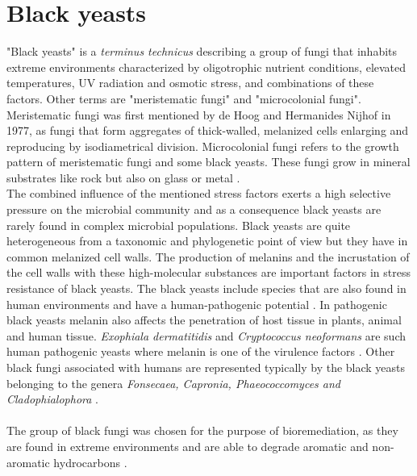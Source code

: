 \documentclass[12pt, a4paper]{report}
\begin{document}
\section{Black yeasts} 
"Black yeasts" is a \textit{terminus technicus} describing a group of fungi that inhabits extreme environments characterized by oligotrophic nutrient conditions, elevated temperatures, UV radiation and osmotic stress, and combinations of these factors. Other terms are "meristematic fungi" and "microcolonial fungi".
Meristematic fungi was first mentioned by de Hoog and Hermanides Nijhof in 1977, as fungi that form aggregates of thick-walled, melanized cells enlarging and reproducing by isodiametrical division. Microcolonial fungi refers to the growth pattern of meristematic fungi and some black yeasts. These fungi grow in mineral substrates like rock but also on glass or metal \cite{Sterflinger2006}. \\
The combined influence of the mentioned stress factors exerts a high selective pressure on the microbial community and as a consequence black yeasts are rarely found in complex microbial populations. Black yeasts are quite heterogeneous from a taxonomic and phylogenetic point of view but they have in common melanized cell walls. The production of melanins and the incrustation of the cell walls with these high-molecular substances are important factors in stress resistance of black yeasts. The black yeasts include species that are also found in human environments and have a human-pathogenic potential \cite{Sterflinger2006}. In pathogenic black yeasts melanin also affects the penetration of host tissue in plants, animal and human tissue. \textit{Exophiala dermatitidis} and \textit{Cryptococcus neoformans} are such human pathogenic yeasts where melanin is one of the virulence factors \cite{Hoog2003, Sterflinger2006}. Other black fungi associated with humans are represented typically by the black yeasts belonging to the genera \textit{Fonsecaea, Capronia, Phaeococcomyces and Cladophialophora} \cite{Blasi2015}. \\
\ \\
The group of black fungi was chosen for the purpose of bioremediation, as they are found in extreme environments and  are able to degrade aromatic and non-aromatic hydrocarbons \cite{Poyntner2014} . 
\end{document}
